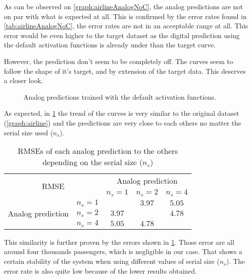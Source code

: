 As can be observed on \cref{graph:airlineAnalogNoC}, the analog predictions are not on par with what is expected at all. This is confirmed by the error rates found in \cref{tab:airlineAnalogNoC}, the error rates are not in an acceptable range at all. This error would be even higher to the target dataset as the digital prediction using the default activation functions is already under than the target curve.

However, the prediction don't seem to be completely off. The curves seem to follow the shape of it's target, and by extension of the target data. This deserves a closer look.

\begin{figure}[H]
  \centering
  
  \caption{Analog predictions trained with the default activation functions.}
  \label{graph:airlineAnalogNoCZoomed}
\end{figure}

As expected, in \cref{graph:airlineAnalogNoCZoomed} the trend of the curves is very similar to the original dataset (\cref{graph:airline}) and the predictions are very close to each others no matter the serial size used ($n_s$).

\begin{table}[H]
  \centering
  \begin{tabular}{|c|c|c|c|c|}
    \hline
    \multicolumn{2}{|c}{\multirow{2}{*}{\ac{RMSE}}} & \multicolumn{3}{|c|}{Analog prediction}\\
    \cline{3-5}
    \multicolumn{2}{|c}{} & \multicolumn{1}{|c|}{$n_s=1$} & $n_s=2$ & $n_s=4$ \\
    \hline
    \multirow{3}{*}{Analog prediction} & $n_s=1$ &\cellcolor[HTML]{202020} & $3.97$ & $5.05$\\
    \cline{2-5}
    & $n_s=2$  & $3.97$ & \cellcolor[HTML]{202020} & $4.78$\\
    \cline{2-5}
    & $n_s=4$ & $5.05$ & $4.78$ & \cellcolor[HTML]{202020}\\
    \hline
  \end{tabular}
  \caption{\acp{RMSE} of each analog prediction to the others depending on the serial size ($n_s$)}
  \label{tab:airlineAnalogNoCZoomed}
\end{table}

This similarity is further proven by the errors shown in \cref{tab:airlineAnalogNoCZoomed}. Those error are all around four thousands passengers, which is negligible in our case. That shows a certain stability of the system when using different values of serial size ($n_s$). The error rate is also quite low because of the lower results obtained.


